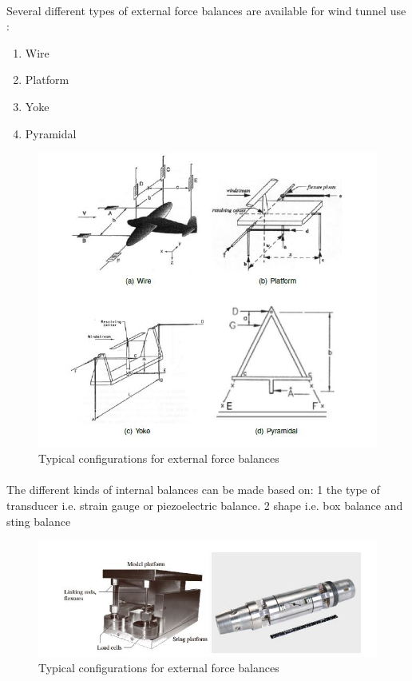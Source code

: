 \paragraph{}Several different types of external force balances are available for wind tunnel use
\cite{morris_force_2010}:
\begin{enumerate}
\item Wire
\item Platform
\item Yoke
\item Pyramidal
\end{enumerate}
\begin{center}
	\begin{figure}[!h]
	\centering
	\includegraphics{Figures/Fig6}
	\caption{Typical configurations for external force balances}
	\end{figure}
\end{center}
\paragraph{}The different kinds of internal balances can be made based on:
1 the type of transducer i.e. strain gauge or piezoelectric balance.
2 shape i.e. box balance and sting balance
\begin{center}
	\begin{figure}[!h]
	\centering
	\includegraphics{Figures/Fig7}
	\caption{Typical configurations for external force balances}
	\end{figure}
\end{center}
